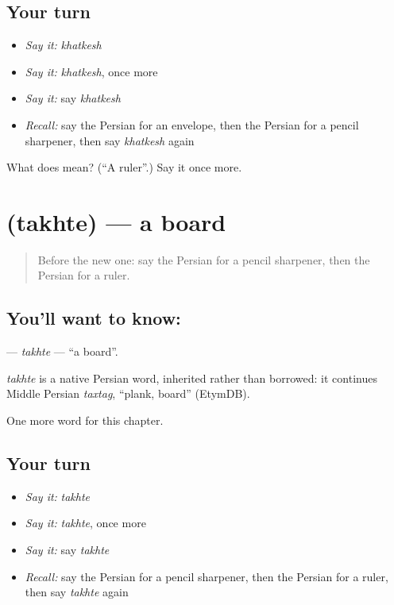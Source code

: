 \subsection*{Your turn}
\begin{itemize}
\raggedright
  \item \emph{Say it:} \emph{khatkesh}
  \item \emph{Say it:} \emph{khatkesh}, once more
  \item \emph{Say it:} say \emph{khatkesh}
  \item \emph{Recall:} say the Persian for an envelope, then the Persian for a pencil sharpener, then say \emph{khatkesh} again
\end{itemize}

\begin{tcolorbox}[breakable,colback=teal!4,colframe=teal!35!black,title={Before you move on}]
What does   mean? (\textquotedblleft{}A ruler\textquotedblright{}.) Say it once more.
\end{tcolorbox}
\section[\texorpdfstring{\fa{تخته} (takhte)}{تخته (takhte)}]{ (takhte) — a board}

\label{lesson:FA-C114-takhte}



\begin{quote}
Before the new one: say the Persian for a pencil sharpener, then the Persian for a ruler.
\end{quote}

\subsection*{You'll want to know: }
\textbf{} — \emph{takhte} — \textquotedblleft{}a board\textquotedblright{}.

\begin{cousinweb}
\emph{takhte} is a native Persian word, inherited rather than borrowed: it continues Middle Persian \emph{taxtag}, \textquotedblleft{}plank, board\textquotedblright{} (EtymDB).
\end{cousinweb}

\begin{grammarlens}[title={What you've built}]
One more word for this chapter.
\end{grammarlens}

\subsection*{Your turn}
\begin{itemize}
\raggedright
  \item \emph{Say it:} \emph{takhte}
  \item \emph{Say it:} \emph{takhte}, once more
  \item \emph{Say it:} say \emph{takhte}
  \item \emph{Recall:} say the Persian for a pencil sharpener, then the Persian for a ruler, then say \emph{takhte} again
\end{itemize}

